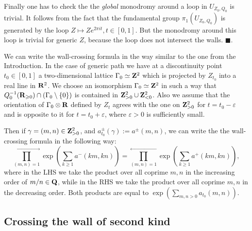\documentclass[12pt]{article}
\begin{document}
Finally one has to check the the {\it global} monodromy around a loop in $U_{Z_0,Q_0}$ is trivial. It follows from the fact that the fundamental group $\pi_1(U_{Z_0,Q_0})$ is generated by the loop $Z\mapsto Ze^{2\pi it}, t\in [0,1]$. But the monodromy around this  loop is trivial for generic $Z$, because the loop does not intersect the walls. $\blacksquare$.
















We can write the wall-crossing formula in the way similar to the one from the Introduction.
In the case of generic path we have at a discontinuity point $t_0\in [0,1]$ a two-dimensional lattice $\Gamma_0\simeq {\bf Z}^2$ which is projected by $Z_{t_0}$ into a real line in ${\bf R}^2$.
We choose an isomorphism $\Gamma_0\simeq {\bf Z}^2$ in such a way that $Q_0^{-1}({\bf R}_{\geqslant 0})\cap (\Gamma_0\setminus \{0\})$ is contained in ${\bf Z}_{>0}^2\cup {\bf Z}^2_{<0}$. Also we assume that the orientation of $\Gamma_0\otimes {\bf R}$ defined by $Z_t$ agrees with the one on ${\bf Z}^2_{>0}$ for $t=t_0-\varepsilon$ and is opposite to it for $t=t_0+\varepsilon$, where $\varepsilon>0$ is sufficiently small.


Then if
$\gamma=(m,n)\in {\bf Z}^2_{>0}$, and $a^{\pm}_{t_0}(\gamma):=a^{\pm}(m,n)$, we can write the
the wall-crossing formula in the following way:
$$\prod_{(m,n)=1}^{\longrightarrow}\exp\left(\sum_{k\geqslant 1}a^{-}(km,kn)\right)=\prod_{(m,n)=1}^{\longleftarrow}\exp\left(\sum_{k\geqslant 1}a^{+}(km,kn)\right),$$
where in the LHS we take the product over all coprime $m,n$ in the increasing order of $m/n\in {\bf Q}$,
while in the RHS we take the product over all coprime $m,n$ in the decreasing order.
Both products are equal to
$\exp(\sum_{m,n> 0}a_{t_0}(m,n))$.

























\subsection{Crossing the wall of  second kind}
\end{document}
